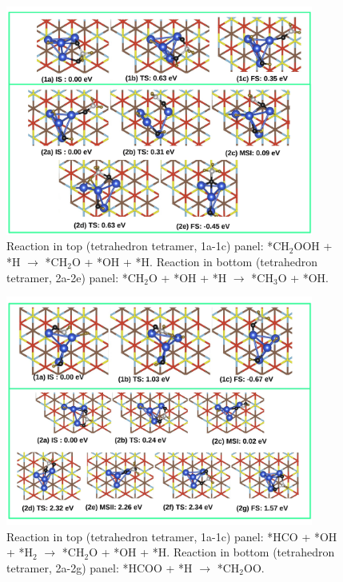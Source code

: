 \begin{figure}
  \begin{center}
    \includegraphics[width=0.9\textwidth]{./Appendix3/figures_si/p_114.jpg}
  \end{center}
    \caption{ Reaction in top (tetrahedron tetramer, 1a-1c) panel: *CH$_2$OOH + *H $\rightarrow$ *CH$_2$O + *OH + *H. Reaction in bottom (tetrahedron tetramer, 2a-2e) panel: *CH$_2$O + *OH + *H $\rightarrow$ *CH$_3$O + *OH. }
  \label{fig:si-114}
\end{figure}

\begin{figure}
  \begin{center}
    \includegraphics[width=0.9\textwidth]{./Appendix3/figures_si/p_116.jpg}
  \end{center}
    \caption{Reaction in top (tetrahedron tetramer, 1a-1c) panel: *HCO + *OH + *H$_2$ $\rightarrow$ *CH$_2$O + *OH + *H. Reaction in bottom (tetrahedron tetramer, 2a-2g) panel: *HCOO + *H $\rightarrow$ *CH$_2$OO.  }
  \label{fig:si-115}
\end{figure}

